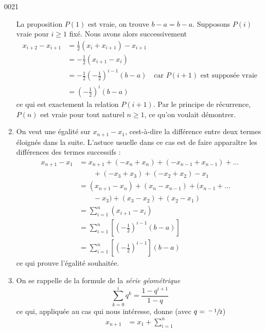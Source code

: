 \begin{corrige}{0021}
\begin{enumerate}
  La proposition $P(1)$ est vraie, on trouve $b-a = b-a$. Supposons
  $P(i)$ vraie pour $i \geq 1$ fixé. Nous avons alors successivement
  \begin{equation*}
    \begin{split}
      x_{i+2} - x_{i+1} &= \frac12 (x_{i} + x_{i+1}) - x_{i+1}\\
      &= -\frac12 \left(x_{i+1} - x_i\right)\\
      &= -\frac12 {\left(-\frac12\right)}^{i-1} (b-a) \quad\text{car
        $P(i+1)$ est supposée vraie}\\
      &= {\left(-\frac12\right)}^{i} (b-a)
    \end{split}
  \end{equation*}
  ce qui est exactement la relation $P(i+1)$. Par le principe de
  récurrence, $P(n)$ est vraie pour tout naturel $n \geq 1$, ce qu'on
  voulait démontrer.
\item On veut une égalité sur $x_{n+1} - x_1$, cest-à-dire la
  différence entre deux termes éloignés dans la suite. L'astuce
  usuelle dans ce cas est de faire apparaître les différences des
  termes successifs :
  \begin{equation*}
    \begin{split}
      x_{n+1} - x_1 &= x_{n+1} + (- x_n + x_n) + (- x_{n-1} + x_{n-1})
      + \ldots\\
      & \qquad + (- x_3 + x_3) + (- x_2 + x_2) - x_1\\
      &= (x_{n+1} - x_n) + (x_n - x_{n-1}) + (x_{n-1} + \ldots\\
      & \qquad - x_3) + (x_3 - x_2) + (x_2 - x_1)\\
      &= \sum_{i=1}^n (x_{i+1} - x_i)\\
      &= \sum_{i=1}^n \left[{\left(-\frac12\right)}^{i-1} (b-a)\right]\\
      &= \sum_{i=1}^n \left[{\left(-\frac12\right)}^{i-1}\right] (b-a)
    \end{split}
  \end{equation*}
  ce qui prouve l'égalité souhaitée.
\item On se rappelle de la formule de la \emph{série géométrique}
  \begin{equation*}
    \sum_{k=0}^i q^k = \frac{1 - q^{i+1}}{1 - q}
  \end{equation*}
  ce qui, appliquée au cas qui nous intéresse, donne (avec $q =
  \sfrac{-1}2$)
  \begin{equation*}
    \begin{split}
      x_{n+1} &= x_1 + \sum_{i=1}^n

\end{split}
\end{equation*}
\end{enumerate}
\end{corrige}
